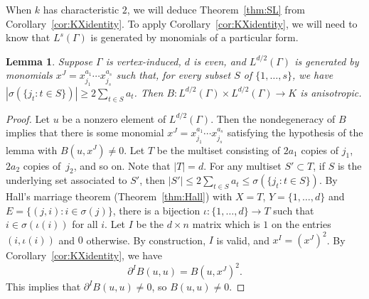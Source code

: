 \documentclass[11pt]{article}
\newtheorem{lemm}[theo]{Lemma}
\theoremstyle{definition}
\numberwithin{equation}{section}
\numberwithin{equation}{section}
\begin{document}
When $k$ has characteristic $2$, we will deduce Theorem~\ref{thm:SL} from Corollary~\ref{cor:KXidentity}. To apply Corollary~\ref{cor:KXidentity}, we will need to know that $L^s(\Gamma)$ is generated by monomials of a particular form. 

\begin{lemm}\label{lem:generationmiddle}
Suppose  $\Gamma$ is vertex-induced, $d$ is even, and $L^{d/2}(\Gamma)$ is generated by monomials $x^J = x_{j_1}^{a_1} \dotsb x_{j_s}^{a_s}$ such that, for every subset $S$ of $\{1, \dotsc, s\}$, we have $|\sigma(\{j_t : t \in S\})| \ge 2\sum_{t \in S} a_t$. Then $B \colon L^{d/2}(\Gamma)\times L^{d/2}(\Gamma) \to K$ is anisotropic. 
\end{lemm}

\begin{proof}
Let $u$ be a nonzero element of $L^{d/2}(\Gamma)$. Then the nondegeneracy of $B$ implies that there is some monomial $x^J = x_{j_1}^{a_1} \dotsb x_{j_s}^{a_s}$ satisfying the hypothesis of the lemma with $B(u, x^J) \not=0$. Let $T$ be the multiset consisting of $2a_1$ copies of $j_1$, $2a_2$ copies of~$j_2$, and so on. Note that $|T| = d$. For any multiset $S' \subset T$, if $S$ is the underlying set associated to $S'$, then $|S'| \le 2 \sum_{t \in S} a_t \le \sigma(\{j_t : t \in S\})$. 
By Hall's marriage theorem (Theorem~\ref{thm:Hall})
with $X = T$, $Y = \{ 1,\ldots,d\}$ and $E = \{ (j,i) : i \in \sigma(j)\}$,
there is 
a bijection $\iota \colon \{1, \dotsc, d\} \to T$ such that 
$i \in \sigma(\iota(i))$ 
for all $i$.
Let $I$ be the $d \times n$ matrix which is $1$ on the entries $(i, \iota(i))$ and $0$ otherwise. By construction, $I$ is valid, and $x^I = (x^J)^2$. By Corollary~\ref{cor:KXidentity}, we have
$$\partial^I B(u, u) = B(u, x^J)^2.$$
This implies that $\partial^I B(u,u) \not=0$, so $B(u, u) \not= 0$. 
\end{proof}
\end{document}
